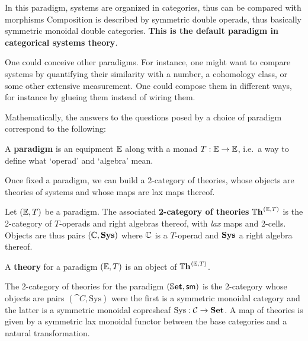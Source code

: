 \begin{example}
	In this paradigm, systems are organized in categories, thus can be compared with morphisms
	Composition is described by symmetric double operads, thus basically symmetric monoidal double categories.
	\textbf{This is the default paradigm in categorical systems theory}.
\end{example}

One could conceive other paradigms.
For instance, one might want to compare systems by quantifying their similarity with a number, a cohomology class, or some other extensive measurement.
One could compose them in different ways, for instance by glueing them instead of wiring them.

Mathematically, the answers to the questions posed by a choice of paradigm correspond to the following:

\begin{definition}[Paradigm]
	A \textbf{paradigm} is an equipment $\dblcat E$ along with a monad $T:\dblcat{E} \to \dblcat{E}$, i.e.~a way to define what `operad' and `algebra' mean.
\end{definition}

Once fixed a paradigm, we can build a 2-category of theories, whose objects are theories of systems and whose maps are lax maps thereof.

\begin{definition}
	Let $\Paradigm$ be a paradigm.
	The associated \textbf{2-category of theories} $\Theories^\Paradigm$ is the 2-category of $T$-operads and right algebras thereof, with \emph{lax} maps and 2-cells.
	Objects are thus pairs $(\Comp, \Sys)$ where $\Comp$ is a $T$-operad and ${\mathbf{Sys}}$ a right algebra thereof.
\end{definition}

\begin{definition}[Theory]
	A \textbf{theory} for a paradigm $\Paradigm$ is an object of $\Theories^\Paradigm$.
\end{definition}

\begin{example}
	The 2-category of theories for the paradigm $(\dblSet, \SymOperads)$ is the 2-category whose objects are pairs $(\cat{C}, \mathrm{Sys})$ were the first is a symmetric monoidal category and the latter is a symmetric monoidal copresheaf $\mathrm{Sys} : \cat{C} \to \Set$.
	A map of theories is given by a symmetric lax monoidal functor between the base categories and a natural transformation.
\end{example}

